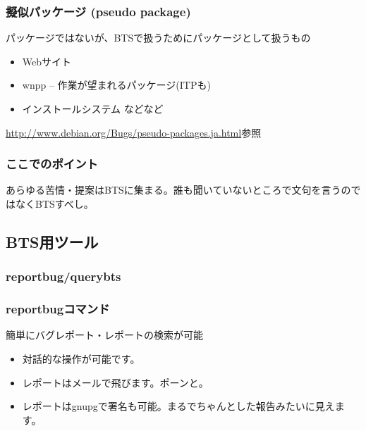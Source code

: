 \documentclass[mingoth,a4paper]{jsarticle}
\begin{document}
\subsubsection{擬似パッケージ (pseudo package)}

パッケージではないが、BTSで扱うためにパッケージとして扱うもの

\begin{itemize}
\item Webサイト
\item wnpp -- 作業が望まれるパッケージ(ITPも)
\item インストールシステム	などなど
\end{itemize}

\url{http://www.debian.org/Bugs/pseudo-packages.ja.html}参照

\subsubsection*{ここでのポイント}

あらゆる苦情・提案はBTSに集まる。誰も聞いていないところで文句を言うのではなくBTSすべし。

\subsection{BTS用ツール}

\subsubsection{reportbug/querybts}

\subsubsection*{reportbugコマンド}

簡単にバグレポート・レポートの検索が可能

\begin{itemize}
\item 対話的な操作が可能です。
\item レポートはメールで飛びます。ポーンと。
\item レポートはgnupgで署名も可能。まるでちゃんとした報告みたいに見えます。
\end{itemize}
\end{document}

